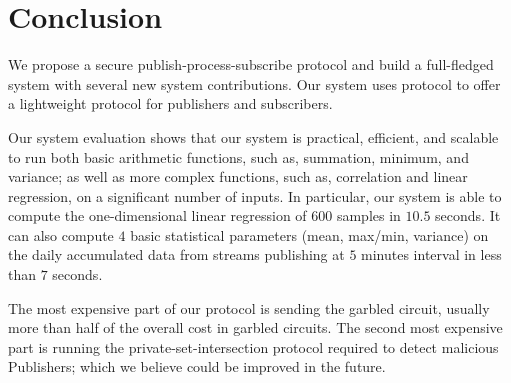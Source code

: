 \section{Conclusion}
\label{sec:conclusion}

We propose a secure publish-process-subscribe protocol and build a full-fledged
system with several new system contributions. Our system uses \MQTT protocol to
offer a lightweight protocol for publishers and subscribers.

Our system evaluation shows that our system is practical, efficient, and
scalable to run both basic arithmetic functions, such as, summation, minimum,
and variance; as well as more complex functions, such as, correlation and
linear regression, on a significant number of inputs. In particular, our system
is able to compute the one-dimensional linear regression of $600$ samples in
$10.5$ seconds. It can also compute $4$ basic statistical parameters (mean,
max/min, variance) on the daily accumulated data from streams publishing at $5$
minutes interval in less than $7$ seconds.

The most expensive part of our protocol is sending the garbled circuit, usually
more than half of the overall cost in garbled circuits.  The second most
expensive part is running the private-set-intersection protocol required to
detect malicious Publishers; which we believe could be improved in the future.

